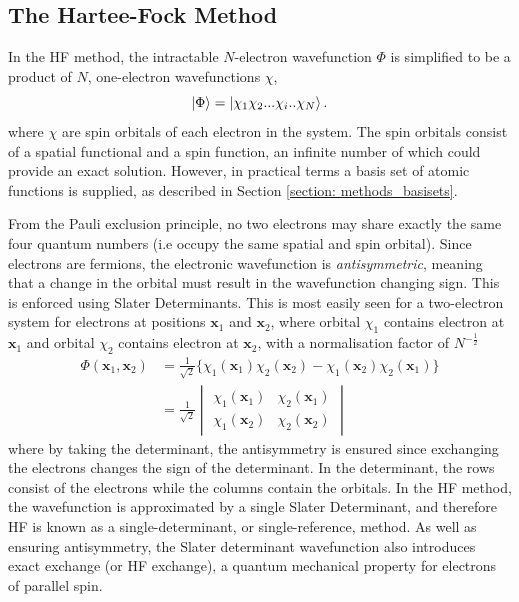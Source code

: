 \subsection{The Hartee-Fock Method}\label{section: methods_HF}
In the \ac{HF} method, the intractable $N$-electron wavefunction $\Phi$ is simplified to be a product of $N$, one-electron wavefunctions $\chi$,
\begin{equation}
\ket{\Phi}=\ket{\chi_{1}\chi_{2}...\chi_{i}..\chi_{N}}.
\end{equation}
 where $\chi$ are spin orbitals of each electron in the system. The spin orbitals consist of a spatial functional and a spin function, an infinite number of which could provide an exact solution. However, in practical terms a basis set of atomic functions is supplied, as described in Section \ref{section: methods_basisets}.
 
 From the Pauli exclusion principle, no two electrons may share exactly the same four quantum numbers (i.e occupy the same spatial and spin orbital). Since electrons are fermions, the electronic wavefunction is \textit{antisymmetric}, meaning that a change in the orbital must result in the wavefunction changing sign. This is enforced using Slater Determinants. This is most easily seen for a two-electron system for electrons at positions $\bm{x}_{1}$ and $\bm{x}_{2}$, where orbital $\chi_{1}$ contains electron at $\bm{x}_1$ and orbital $\chi_{2}$ contains electron at $\bm{x}_2$, with a normalisation factor of $N^{-\frac{1}{2}}$
\begin{equation}
\begin{split}
\Phi(\bm{x}_{1},\bm{x}_{2})&=\frac{1}{\sqrt{2}}\{\chi_{1}(\bm{x}_{1})\chi_{2}(\bm{x}_{2})-\chi_{1}(\bm{x}_{2})\chi_{2}(\bm{x}_{1})\}\\
&=\frac{1}{\sqrt{2}}
\begin{vmatrix}
\chi_{1}(\bm{x}_{1})&\chi_{2}(\bm{x}_{1})\\
\chi_{1}(\bm{x}_{2})&\chi_{2}(\bm{x}_{2})
\end{vmatrix}
\end{split}
\end{equation}
where by taking the determinant, the antisymmetry is ensured since exchanging the electrons changes the sign of the determinant. In the determinant, the rows consist of the electrons while the columns contain the orbitals. In the \ac{HF} method, the wavefunction is approximated by a single Slater Determinant, and therefore \ac{HF} is known as a single-determinant, or single-reference, method.  As well as ensuring antisymmetry, the Slater determinant wavefunction also introduces exact exchange (or HF exchange), a quantum mechanical property for electrons of parallel spin.

